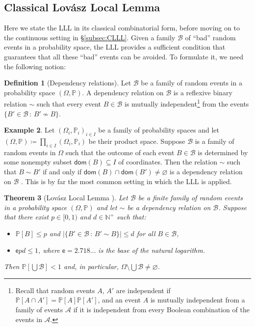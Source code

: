 \documentclass[11pt,reqno,psamsfonts]{amsart}
\theoremstyle{bfnote}
\newtheorem{theo}{Theorem}[section]
\theoremstyle{definition}
\newtheorem{defn}[theo]{Definition}
\newtheorem{exmp}[theo]{Example}
\theoremstyle{remark}
\newcommand{\0}{\varnothing}
\newcommand{\set}[1]{\{#1\}}
\renewcommand{\P}{\mathbb{P}}
\renewcommand{\leq}{\leqslant}
\newcommand{\defeq}{\coloneqq}
\newcommand{\emphd}[1]{{\fontseries{b}\selectfont\textsf{#1}}}
\newcommand{\N}{\mathbb{N}}
\newcommand{\dom}{\mathsf{dom}}
\numberwithin{equation}{section}
\begin{document}
    \subsection{Classical Lov\'asz Local Lemma}\label{subsec:LLL}

    Here we state the LLL in its classical combinatorial form, before moving on to the continuous setting in \S\ref{subsec:CLLL}. Given a family $\mathcal{B}$ of ``bad'' random events in a probability space, the LLL provides a sufficient condition that guarantees that all these ``bad'' events can be avoided. To formulate it, we need the following notion:

    \begin{defn}[Dependency relations]
        Let $\mathcal{B}$ be a family of random events in a probability space $(\Omega, \P)$. A \emphd{dependency relation} on $\mathcal{B}$ is a reflexive binary relation $\sim$ %
        such that every event $B \in \mathcal{B}$ is mutually independent\footnote{Recall that random events $A$, $A'$ are \emphd{independent} if $\P[A \cap A'] = \P[A] \P[A']$, and an event $A$ is \emphd{mutually independent} from a family of events $\mathcal{A}$ if it is independent from every Boolean combination of the events in $\mathcal{A}$.} from the events $\set{B' \in \mathcal{B} \,:\, B' \not\sim B}$.
    \end{defn}

    \begin{exmp}\label{exmp:vbl}
        Let $(\Omega_i, \P_i)_{i \in I}$ be a family of probability spaces and let $(\Omega, \P) \defeq \prod_{i \in I} (\Omega_i, \P_i)$ be their product space. Suppose $\mathcal{B}$ is a family of random events in $\Omega$ such that the outcome of each event $B \in \mathcal{B}$ is determined by some nonempty subset $\dom(B) \subseteq I$ of coordinates. Then the relation $\sim$ such that $B \sim B'$ if and only if $\dom(B) \cap \dom(B' )\neq \0$ is a dependency relation on $\mathcal{B}$ \cite[41]{MolloyReed}. This is by far the most common setting in which the LLL is applied.
    \end{exmp}

    \begin{theo}[{Lov\'asz Local Lemma \cites{EL}{SpencerRamsey}[Corl.~5.1.2]{AS}}]\label{theo:LLL}
        Let $\mathcal{B}$ be a finite family of random events in a probability space $(\Omega, \P)$ and let $\sim$ be a dependency relation on $\mathcal{B}$. Suppose that there exist $p \in [0,1)$ and $d \in \N^+$ such that:
        \begin{itemize}
            \item $\P[B] \leq p$ and $|\set{B' \in \mathcal{B} \,:\, B' \sim B}| \leq d$ for all $B \in \mathcal{B}$,
            \item $\mathsf{e} p d \leq 1$, where $\mathsf{e} = 2.718\ldots$ is the base of the natural logarithm. 
        \end{itemize}
        Then $\P\left[\bigcup \mathcal{B}\right] < 1$ and, in particular, $\Omega \setminus \bigcup \mathcal{B} \neq \0$.
    \end{theo}
\end{document}
